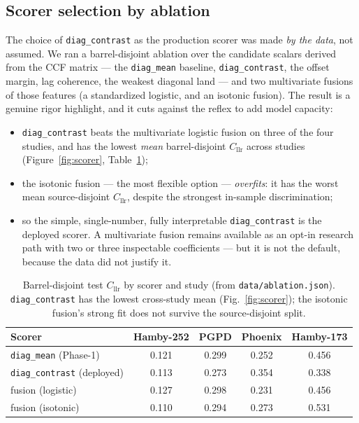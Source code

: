 \documentclass[11pt]{article}
\newcommand{\Cllr}{C_{\mathrm{llr}}}
\newcommand{\diagmean}{\texttt{diag\_mean}}
\newcommand{\diagcontrast}{\texttt{diag\_contrast}}
\newcommand{\code}[1]{\texttt{#1}}
\begin{document}
\subsection{Scorer selection by ablation}
\label{sec:scorerablation}
The choice of \diagcontrast{} as the production scorer was made \emph{by the data},
not assumed. We ran a barrel-disjoint ablation over the candidate scalars derived
from the CCF matrix --- the \diagmean{} baseline, \diagcontrast{}, the offset
margin, lag coherence, the weakest diagonal land --- and two multivariate fusions
of those features (a standardized logistic, and an isotonic fusion). The result is
a genuine rigor highlight, and it cuts against the reflex to add model capacity:

\begin{itemize}
  \item \diagcontrast{} beats the multivariate logistic fusion on three of the four
        studies, and has the lowest \emph{mean} barrel-disjoint $\Cllr$ across
        studies (Figure~\ref{fig:scorer}, Table~\ref{tab:scorer});
  \item the isotonic fusion --- the most flexible option --- \emph{overfits}: it has
        the worst mean source-disjoint $\Cllr$, despite the strongest in-sample
        discrimination;
  \item so the simple, single-number, fully interpretable \diagcontrast{} is the
        deployed scorer. A multivariate fusion remains available as an opt-in
        research path with two or three inspectable coefficients --- but it is not
        the default, because the data did not justify it.
\end{itemize}

\begin{table}[t]
  \centering
  \small
  \begin{tabular}{@{}lcccc@{}}
    \toprule
    \textbf{Scorer} & \textbf{Hamby-252} & \textbf{PGPD} & \textbf{Phoenix} & \textbf{Hamby-173} \\
    \midrule
    \diagmean{} (Phase-1)     & \num{0.121} & \num{0.299} & \num{0.252} & \num{0.456} \\
    \diagcontrast{} (deployed) & \num{0.113} & \num{0.273} & \num{0.354} & \num{0.338} \\
    fusion (logistic)         & \num{0.127} & \num{0.298} & \num{0.231} & \num{0.456} \\
    fusion (isotonic)         & \num{0.110} & \num{0.294} & \num{0.273} & \num{0.531} \\
    \bottomrule
  \end{tabular}
  \caption{Barrel-disjoint test $\Cllr$ by scorer and study (from
    \code{data/ablation.json}). \diagcontrast{} has the lowest cross-study mean
    (Fig.~\ref{fig:scorer}); the isotonic fusion's strong fit does not survive the
    source-disjoint split.}
  \label{tab:scorer}
\end{table}
\end{document}
